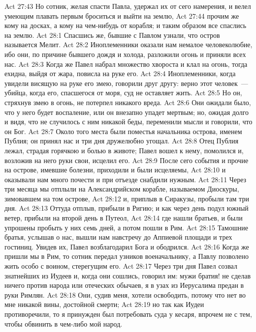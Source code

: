 \vs Act 27:43 Но сотник, желая спасти Павла, удержал их от сего намерения, и велел умеющим плавать первым броситься и выйти на землю,
\vs Act 27:44 прочим же  кому на досках, а кому на чем-нибудь от корабля; и таким образом все спаслись на землю.
\vs Act 28:1 Спасшись же, бывшие с Павлом узнали, что остров называется Мелит.
\vs Act 28:2 Иноплеменники оказали нам немалое человеколюбие, ибо они, по причине бывшего дождя и холода, разложили огонь и приняли всех нас.
\vs Act 28:3 Когда же Павел набрал множество хвороста и клал на огонь, тогда ехидна, выйдя от жара, повисла на руке его.
\vs Act 28:4 Иноплеменники, когда увидели висящую на руке его змею, говорили друг другу: верно этот человек~--- убийца, когда его, спасшегося от моря, суд  не оставляет жить.
\vs Act 28:5 Но он, стряхнув змею в огонь, не потерпел никакого вреда.
\vs Act 28:6 Они ожидали было, что у него будет воспаление, или он внезапно упадет мертвым; но, ожидая долго и видя, что не случилось с ним никакой беды, переменили мысли и говорили, что он Бог.
\rsbpar\vs Act 28:7 Около того места были поместья начальника острова, именем Публия; он принял нас и три дня дружелюбно угощал.
\vs Act 28:8 Отец Публия лежал, страдая горячкою и болью в животе; Павел вошел к нему, помолился и, возложив на него руки свои, исцелил его.
\vs Act 28:9 После сего события и прочие на острове, имевшие болезни, приходили и были исцеляемы,
\vs Act 28:10 и оказывали нам много почести и при отъезде снабдили нужным.
\rsbpar\vs Act 28:11 Через три месяца мы отплыли на Александрийском корабле, называемом Диоскуры, зимовавшем на том острове,
\vs Act 28:12 и, приплыв в Сиракузы, пробыли там три дня.
\vs Act 28:13 Оттуда отплыв, прибыли в Ригию; и как через день подул южный ветер, прибыли на второй день в Путеол,
\vs Act 28:14 где нашли братьев, и были упрошены пробыть у них семь дней, а потом пошли в Рим.
\vs Act 28:15 Тамошние братья, услышав о нас, вышли нам навстречу до Аппиевой площади и трех гостиниц. Увидев их, Павел возблагодарил Бога и ободрился.
\vs Act 28:16 Когда же пришли мы в Рим, то сотник передал узников военачальнику, а Павлу позволено жить особо с воином, стерегущим его.
\rsbpar\vs Act 28:17 Через три дня Павел созвал знатнейших из Иудеев и, когда они сошлись, говорил им: мужи братия! не сделав ничего против народа или отеческих обычаев, я в узах из Иерусалима предан в руки Римлян.
\vs Act 28:18 Они, судив меня, хотели освободить, потому что нет во мне никакой вины, достойной смерти;
\vs Act 28:19 но так как Иудеи противоречили, то я принужден был потребовать суда у кесаря, впрочем не с тем, чтобы обвинить в чем-либо мой народ.
